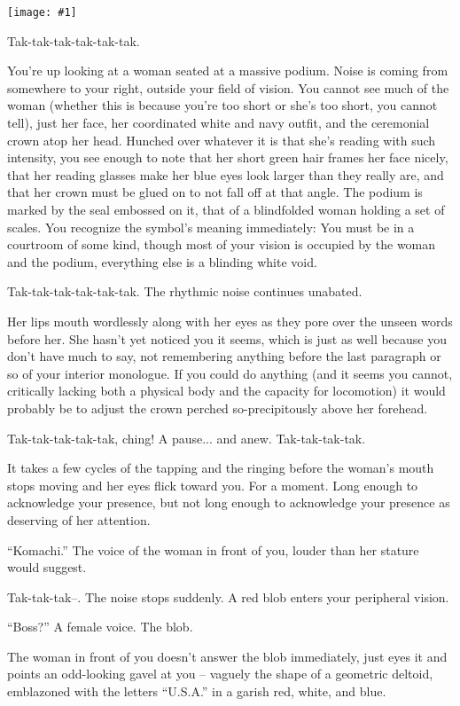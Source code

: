 \documentclass[a4paper,12pt]{book}
\newcommand{\img}[1]{%
	\texttt{[image: \#1]}%
}
\begin{document}
\img{siki}

Tak-tak-tak-tak-tak-tak.

You're up looking at a woman seated at a massive podium. Noise is coming from somewhere to your right, outside your field of vision. You cannot see much of the woman (whether this is because you're too short or she's too short, you cannot tell), just her face, her coordinated white and navy outfit, and the ceremonial crown atop her head. Hunched over whatever it is that she's reading with such intensity, you see enough to note that her short green hair frames her face nicely, that her reading glasses make her blue eyes look larger than they really are, and that her crown must be glued on to not fall off at that angle. The podium is marked by the seal embossed on it, that of a blindfolded woman holding a set of scales. You recognize the symbol's meaning immediately: You must be in a courtroom of some kind, though most of your vision is occupied by the woman and the podium, everything else is a blinding white void.

Tak-tak-tak-tak-tak-tak. The rhythmic noise continues unabated.

Her lips mouth wordlessly along with her eyes as they pore over the unseen words before her. She hasn't yet noticed you it seems, which is just as well because you don't have much to say, not remembering anything before the last paragraph or so of your interior monologue. If you could do anything (and it seems you cannot, critically lacking both a physical body and the capacity for locomotion) it would probably be to adjust the crown perched so-precipitously above her forehead.

Tak-tak-tak-tak-tak, ching! A pause... and anew. Tak-tak-tak-tak.

It takes a few cycles of the tapping and the ringing before the woman's mouth stops moving and her eyes flick toward you. For a moment. Long enough to acknowledge your presence, but not long enough to acknowledge your presence as deserving of her attention.

``Komachi.'' The voice of the woman in front of you, louder than her stature would suggest.

Tak-tak-tak--. The noise stops suddenly. A red blob enters your peripheral vision.

``Boss?'' A female voice. The blob.

The woman in front of you doesn't answer the blob immediately, just eyes it and points an odd-looking gavel at you -- vaguely the shape of a geometric deltoid, emblazoned with the letters ``U.S.A.'' in a garish red, white, and blue.
\end{document}
